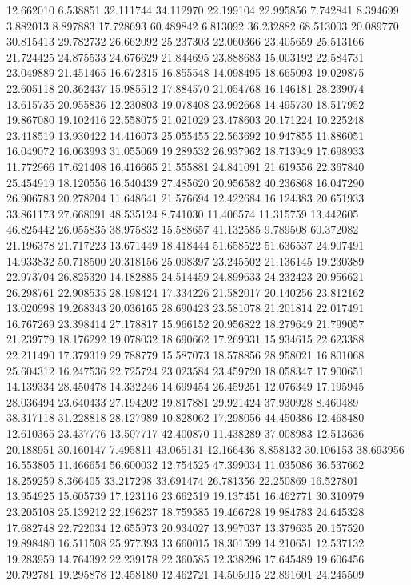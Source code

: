12.662010
6.538851
32.111744
34.112970
22.199104
22.995856
7.742841
8.394699
3.882013
8.897883
17.728693
60.489842
6.813092
36.232882
68.513003
20.089770
30.815413
29.782732
26.662092
25.237303
22.060366
23.405659
25.513166
21.724425
24.875533
24.676629
21.844695
23.888683
15.003192
22.584731
23.049889
21.451465
16.672315
16.855548
14.098495
18.665093
19.029875
22.605118
20.362437
15.985512
17.884570
21.054768
16.146181
28.239074
13.615735
20.955836
12.230803
19.078408
23.992668
14.495730
18.517952
19.867080
19.102416
22.558075
21.021029
23.478603
20.171224
10.225248
23.418519
13.930422
14.416073
25.055455
22.563692
10.947855
11.886051
16.049072
16.063993
31.055069
19.289532
26.937962
18.713949
17.698933
11.772966
17.621408
16.416665
21.555881
24.841091
21.619556
22.367840
25.454919
18.120556
16.540439
27.485620
20.956582
40.236868
16.047290
26.906783
20.278204
11.648641
21.576694
12.422684
16.124383
20.651933
33.861173
27.668091
48.535124
8.741030
11.406574
11.315759
13.442605
46.825442
26.055835
38.975832
15.588657
41.132585
9.789508
60.372082
21.196378
21.717223
13.671449
18.418444
51.658522
51.636537
24.907491
14.933832
50.718500
20.318156
25.098397
23.245502
21.136145
19.230389
22.973704
26.825320
14.182885
24.514459
24.899633
24.232423
20.956621
26.298761
22.908535
28.198424
17.334226
21.582017
20.140256
23.812162
13.020998
19.268343
20.036165
28.690423
23.581078
21.201814
22.017491
16.767269
23.398414
27.178817
15.966152
20.956822
18.279649
21.799057
21.239779
18.176292
19.078032
18.690662
17.269931
15.934615
22.623388
22.211490
17.379319
29.788779
15.587073
18.578856
28.958021
16.801068
25.604312
16.247536
22.725724
23.023584
23.459720
18.058347
17.900651
14.139334
28.450478
14.332246
14.699454
26.459251
12.076349
17.195945
28.036494
23.640433
27.194202
19.817881
29.921424
37.930928
8.460489
38.317118
31.228818
28.127989
10.828062
17.298056
44.450386
12.468480
12.610365
23.437776
13.507717
42.400870
11.438289
37.008983
12.513636
20.188951
30.160147
7.495811
43.065131
12.166436
8.858132
30.106153
38.693956
16.553805
11.466654
56.600032
12.754525
47.399034
11.035086
36.537662
18.259259
8.366405
33.217298
33.691474
26.781356
22.250869
16.527801
13.954925
15.605739
17.123116
23.662519
19.137451
16.462771
30.310979
23.205108
25.139212
22.196237
18.759585
19.466728
19.984783
24.645328
17.682748
22.722034
12.655973
20.934027
13.997037
13.379635
20.157520
19.898480
16.511508
25.977393
13.660015
18.301599
14.210651
12.537132
19.283959
14.764392
22.239178
22.360585
12.338296
17.645489
19.606456
20.792781
19.295878
12.458180
12.462721
14.505015
22.891601
24.245509
